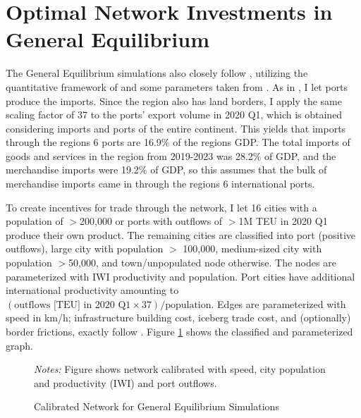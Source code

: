 \documentclass[a4paper]{article}
\begin{document}


 \newpage


\section{Optimal Network Investments in General Equilibrium}

The General Equilibrium simulations also closely follow \citet{krantz2024optimal}, utilizing the quantitative framework of \citet{fajgelbaum2020optimal} and some parameters taken from \citet{graff2024spatial}. As in \citet{krantz2024optimal}, I let ports produce the imports. Since the region also has land borders, I apply the same scaling factor of 37 to the ports' export volume in 2020 Q1, which is obtained considering imports and ports of the entire continent. This yields that imports through the regions 6 ports are 16.9\% of the regions GDP. The total imports of goods and services in the region from 2019-2023 was 28.2\% of GDP, and the merchandise imports were 19.2\% of GDP, so this assumes that the bulk of merchandise imports came in through the regions 6 international ports.  \newline 

To create incentives for trade through the network, I let 16 cities with a population of $>$200,000 or ports with outflows of $>$1M TEU in 2020 Q1 produce their own product. The remaining cities are classified into port (positive outflows), large city with population $>$ 100,000, medium-sized city with population $>$50,000, and town/unpopulated node otherwise. The nodes are parameterized with IWI productivity and population. Port cities have additional international productivity amounting to $(\text{outflows [TEU] in 2020 Q1}\times 37)/\text{population}$. Edges are parameterized with speed in km/h; infrastructure building cost, iceberg trade cost, and (optionally) border frictions, exactly follow \citet{krantz2024optimal}. Figure \ref{fig:Graph_Calib} shows the classified and parameterized graph. \newline 

\begin{figure}[h!] \vspace{-2mm}
\centering
\caption{\label{fig:Graph_Calib} Calibrated Network for General Equilibrium Simulations}
\vspace{2mm}
\scriptsize 
\emph{Notes:} Figure shows network calibrated with speed, city population and productivity (IWI) and port outflows. 
\end{figure}
\end{document}
